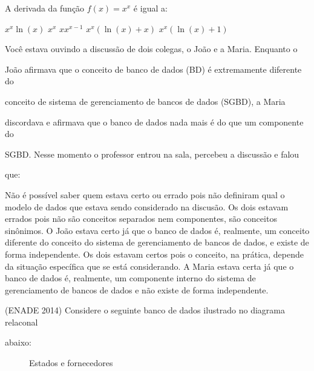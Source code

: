 \documentclass[12pt, addpoints]{exam}
\begin{document}
    \begin{questions}

    \newpage
    \question

A derivada da função \( f(x) = x^x \) é igual a:
\begin{choices}
\choice \( x^x \ln(x) \)
\choice \( x^x \)
\choice \( x x^{x-1} \)
\choice \( x^x (\ln(x) + x) \)
\choice \( x^x (\ln(x) + 1) \)
\end{choices}

\question

Você estava ouvindo a discussão de dois colegas, o João e a Maria. Enquanto o

João afirmava que o conceito de banco de dados (BD) é extremamente diferente do

conceito de sistema de gerenciamento de bancos de dados (SGBD), a Maria

discordava e afirmava que o banco de dados nada mais é do que um componente do

SGBD. Nesse momento o professor entrou na sala, percebeu a discussão e falou

que:
\begin{choices}
\choice Não é possível saber quem estava certo ou errado pois não definiram qual o modelo de dados que estava sendo considerado na discusão.
\choice Os dois estavam errados pois não são conceitos separados nem componentes, são conceitos sinônimos.
\choice O João estava certo já que o banco de dados é, realmente, um conceito diferente do conceito do sistema de gerenciamento de bancos de dados, e existe de forma independente.
\choice Os dois estavam certos pois o conceito, na prática, depende da situação específica que se está considerando.
\choice A Maria estava certa já que o banco de dados é, realmente, um componente interno do sistema de gerenciamento de bancos de dados e não existe de forma independente.
\end{choices}

\question

(ENADE 2014) Considere o seguinte banco de dados ilustrado no diagrama relaconal

abaixo:

\begin{figure}[H]

  \centering

  \caption{Estados e fornecedores}

  \label{fig:estados}


\end{figure}
\end{questions}
\end{document}
